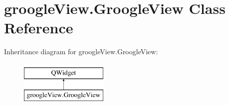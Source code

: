 \hypertarget{classgroogleView_1_1GroogleView}{\section{groogle\-View.\-Groogle\-View Class Reference}
\label{classgroogleView_1_1GroogleView}
}
Inheritance diagram for groogle\-View.\-Groogle\-View\-:\begin{figure}[H]
\begin{center}
\leavevmode
\includegraphics[height=2.000000cm]{classgroogleView_1_1GroogleView}
\end{center}
\end{figure}
